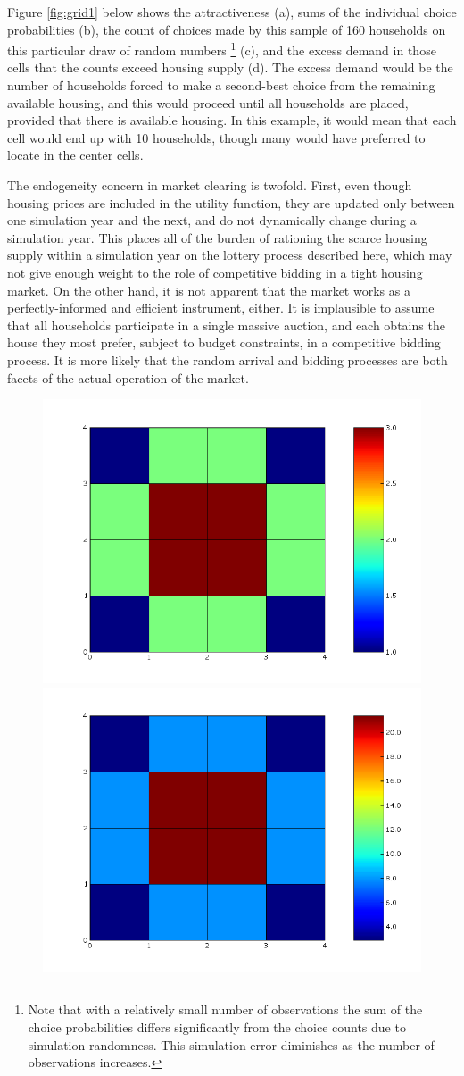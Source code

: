 \documentclass[12pt,a4paper]{article}
\begin{document}
Figure \ref{fig:grid1} below shows the attractiveness (a), sums of
the individual choice probabilities (b), the count of choices made
by this sample of 160 households on this particular draw of random
numbers \footnote{Note that with a relatively small number of
observations the sum of the choice probabilities differs
significantly from the choice counts due to simulation randomness.
This simulation error diminishes as the number of observations
increases.} (c), and the excess demand in those cells that the
counts exceed housing supply (d).  The excess demand would be the
number of households forced to make a second-best choice from the
remaining available housing, and this would proceed until all
households are placed, provided that there is available housing.
In this example, it would mean that each cell would end up with 10
households, though many would have preferred to locate in the
center cells.

The endogeneity concern in market clearing is twofold.  First,
even though housing prices are included in the utility function,
they are updated only between one simulation year and the next,
and do not dynamically change during a simulation year.  This
places all of the burden of rationing the scarce housing supply
within a simulation year on the lottery process described here,
which may not give enough weight to the role of competitive
bidding in a tight housing market.  On the other hand, it is not
apparent that the market works as a perfectly-informed and
efficient instrument, either. It is implausible to assume that all
households participate in a single massive auction, and each
obtains the house they most prefer, subject to budget constraints,
in a competitive bidding process.  It is more likely that the
random arrival and bidding processes are both facets of the actual
operation of the market.

\begin{figure}[h]
\centerline{
 \includegraphics[width=.45\textwidth,height=0.35\textwidth]
 {example_grid_util.png} \hspace{1cm}
 \includegraphics[width=.45\textwidth,height=0.35\textwidth]
 {example_grid_prob.png}}
\end{figure}
\end{document}
